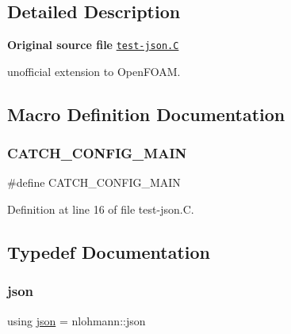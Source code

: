 \subsection{Detailed Description}
{\bfseries Original source file} \href{../../../home/carlo/data/GeN-Foam/GeN-Foam_ffn/GeN-Foam/GeN-Foam/FMU4FOAM/ECI4FOAM/application/test/test-json/test-json.C}{\tt test-\/json.\+C}

\begin{DoxyVerb}unofficial extension to OpenFOAM.\end{DoxyVerb}


\subsection{Macro Definition Documentation}
\mbox{\label{test-json_8C_a656eb5868e824d59f489f910db438420}} 
\subsubsection{\texorpdfstring{C\+A\+T\+C\+H\+\_\+\+C\+O\+N\+F\+I\+G\+\_\+\+M\+A\+IN}{CATCH\_CONFIG\_MAIN}}
{\footnotesize\ttfamily \#define C\+A\+T\+C\+H\+\_\+\+C\+O\+N\+F\+I\+G\+\_\+\+M\+A\+IN}



Definition at line 16 of file test-\/json.\+C.



\subsection{Typedef Documentation}
\mbox{\label{test-json_8C_ab701e3ac61a85b337ec5c1abaad6742d}} 
\subsubsection{\texorpdfstring{json}{json}}
{\footnotesize\ttfamily using \hyperlink{dictModifier_8C_ab701e3ac61a85b337ec5c1abaad6742d}{json} =  nlohmann\+::json}



